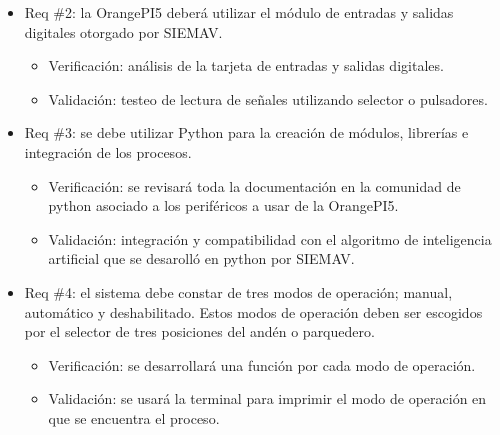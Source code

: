 \documentclass[
11pt, %
]{charter}
\begin{document}
\begin{itemize} 
	\item Req \#2: la OrangePI5 deberá utilizar el módulo de entradas y salidas digitales otorgado por SIEMAV.
	
	\begin{itemize}
		\item Verificación: análisis de la tarjeta de entradas y salidas digitales. 
		\item Validación: testeo de lectura de señales utilizando selector o pulsadores.  
	\end{itemize}
	
	\end{itemize}

	\begin{itemize} 
		\item Req \#3: se debe utilizar Python para la creación de módulos, librerías e integración de los procesos.
		
		\begin{itemize}
			\item Verificación: se revisará toda la documentación en la comunidad de python asociado a los periféricos a usar de la OrangePI5. 
			\item Validación: integración y compatibilidad con el algoritmo de inteligencia artificial que se desarolló en python por SIEMAV.  
		\end{itemize}
		
		\end{itemize}

\begin{itemize} 
	\item Req \#4: el sistema debe constar de tres modos de operación; manual, automático y deshabilitado. Estos modos de operación deben ser escogidos por el selector de tres posiciones del andén o parquedero.
	
	\begin{itemize}
		\item Verificación: se desarrollará una función por cada modo de operación. 
		\item Validación: se usará la terminal para imprimir el modo de operación en que se encuentra el proceso.  
	\end{itemize}
	
	\end{itemize}
\end{document}
